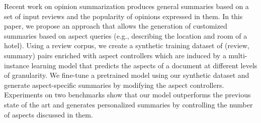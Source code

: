 Recent work on opinion summarization produces general summaries based on a set of input reviews and the popularity of opinions expressed in them. In this paper, we propose an approach that allows the generation of customized summaries based on aspect queries (e.g., describing the location and room of a hotel). Using a review corpus, we create a synthetic training dataset of (review, summary) pairs enriched with aspect controllers which are induced by a multi-instance learning model that predicts the aspects of a document at different levels of granularity. We fine-tune a pretrained model using our synthetic dataset and generate aspect-specific summaries by modifying the aspect controllers. Experiments on two benchmarks show that our model outperforms the previous state of the art and generates personalized summaries by controlling the number of aspects discussed in them.
